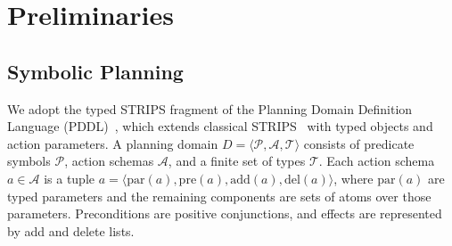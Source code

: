 \section{Preliminaries}

\subsection{Symbolic Planning}





We adopt the typed STRIPS fragment of the Planning Domain Definition Language (PDDL)~\cite{mcdermott1998pddl}, which extends classical STRIPS~\cite{fikes1971strips} with typed objects and action parameters. A planning domain $D = \langle \mathcal{P}, \mathcal{A}, \mathcal{T} \rangle$ consists of predicate symbols $\mathcal{P}$, action schemas $\mathcal{A}$, and a finite set of types $\mathcal{T}$. Each action schema $a \in \mathcal{A}$ is a tuple $a = \langle \mathrm{par}(a), \mathrm{pre}(a), \mathrm{add}(a), \mathrm{del}(a) \rangle$, where $\mathrm{par}(a)$ are typed parameters and the remaining components are sets of atoms over those parameters. Preconditions are positive conjunctions, and effects are represented by add and delete lists.

